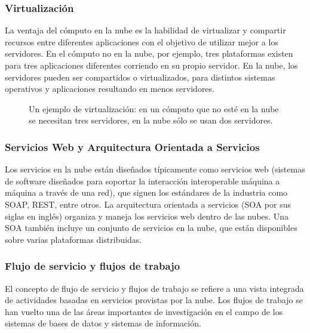 \subsubsection{Virtualización}
\label{\detokenize{chapter_one/cloud_computing:virtualizacion}}
La ventaja del cómputo en la nube es la habilidad de virtualizar y compartir
recursos entre diferentes aplicaciones con el objetivo de utilizar mejor a los
servidores. En el cómputo no en la nube, por ejemplo, tres plataformas existen para
tres aplicaciones diferentes corriendo en su propio servidor. En la nube,
los servidores pueden ser compartidos o virtualizados, para distintos sistemas
operativos y aplicaciones resultando en menos servidores.

\begin{figure}[ht]
\centering
\capstart

\noindent{}
\caption{Un ejemplo de virtualización: en un cómputo que no esté en la nube se necesitan tres servidores, en la nube sólo se usan dos servidores.}\label{\detokenize{chapter_one/cloud_computing:c-computing-virtualization}}\end{figure}


\subsubsection{Servicios Web y Arquitectura Orientada a Servicios}
\label{\detokenize{chapter_one/cloud_computing:servicios-web-y-arquitectura-orientada-a-servicios}}
Los servicios en la nube están diseñados típicamente como servicios web (sistemas
de software diseñados para soportar la interacción interoperable máquina a máquina
a través de una red), que siguen los estándares de la industria como SOAP, REST, entre
otros. La arquitectura orientada a servicios (SOA por sus siglas en inglés) organiza y maneja
los servicios web dentro de las nubes. Una SOA también incluye un conjunto
de servicios en la nube, que están disponibles sobre varias plataformas distribuidas.


\subsubsection{Flujo de servicio y flujos de trabajo}
\label{\detokenize{chapter_one/cloud_computing:flujo-de-servicio-y-flujos-de-trabajo}}
El concepto de flujo de servicio y flujos de trabajo se refiere a una
vista integrada de actividades basadas en servicios provistas por la nube.
Los flujos de trabajo se han vuelto una de las áreas importantes
de investigación en el campo de los sistemas de bases de datos
y sistemas de información.


